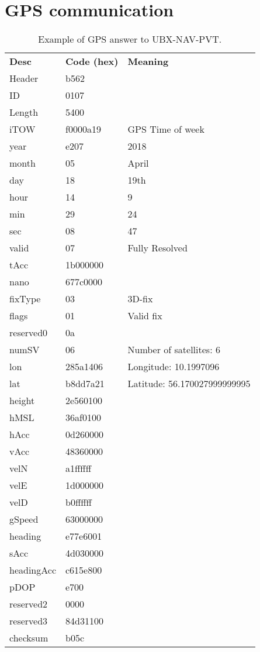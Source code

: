 \appendix

\chapter{GPS communication}
\label{app:GPScomm}
\begin{table}[H]
	\centering
	\setlength{\extrarowheight}{0pt}
	\begin{tabularx}{0.8\textwidth}{p{2cm} p{2cm} X}
		\oldtoprule
		\textbf{Desc} & \textbf{Code (hex)} & \textbf{Meaning} \\
		\oldmidrule
		Header & b562 & \\
		ID & 0107 & \\
		Length & 5400 & \\
		iTOW & f0000a19 & GPS Time of week \\
		year & e207 & 2018 \\
		month & 05 & April \\
		day & 18 & 19th \\
		hour & 14 & 9 \\
		min & 29 & 24 \\
		sec & 08 & 47 \\
		valid & 07 & Fully Resolved \\
		tAcc & 1b000000 & \\
		nano & 677c0000 & \\
		fixType & 03 & 3D-fix \\
		flags & 01 & Valid fix \\
		reserved0 & 0a & \\
		numSV & 06 & Number of satellites: 6 \\
		lon & 285a1406 & Longitude: 10.1997096 \\
		lat & b8dd7a21 & Latitude: 56.170027999999995 \\
		height & 2e560100 & \\
		hMSL & 36af0100 & \\
		hAcc & 0d260000 & \\
		vAcc & 48360000 & \\
		velN & a1ffffff & \\
		velE & 1d000000 & \\
		velD & b0ffffff & \\
		gSpeed & 63000000 & \\
		heading & e77e6001 & \\
		sAcc & 4d030000 & \\
		headingAcc & c615e800 & \\
		pDOP & e700 & \\
		reserved2 & 0000 & \\
		reserved3 & 84d31100 & \\
		checksum & b05c & \\
		\bottomrule
	\end{tabularx}
	\caption{Example of GPS answer to UBX-NAV-PVT\cite[p.~160-161]{NEO7_proto}.}
	\label{tab:GPScomm}
\end{table}